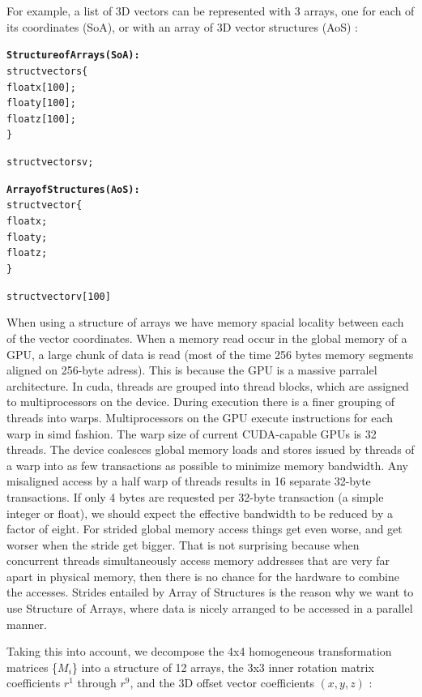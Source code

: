 \documentclass[12pt,journal,compsoc]{IEEEtran}
\begin{document}
For example, a list of 3D vectors can be represented with 3 arrays, one for each of its coordinates (SoA), or with an array of 3D vector structures (AoS) :

\begin{samepage}
\begin{alltt}
\textbf{Structure of Arrays (SoA):}
struct vectors \{
    float x[100];
    float y[100];
    float z[100];
\}

struct vectors v;

\textbf{Array of Structures (AoS):}
struct vector \{
    float x;
    float y;
    float z;
\}

struct vector v[100]
\end{alltt}
\end{samepage}

When using a structure of arrays we have memory spacial locality between each of the vector coordinates. When a memory read occur in the global memory of a GPU, a large chunk of data is read (most of the time 256 bytes memory segments aligned on 256-byte adress). This is because the GPU is a massive parralel architecture.
In \ac{cuda}, threads are grouped into thread blocks, which are assigned to multiprocessors on the device. During execution there is a finer grouping of threads into warps. Multiprocessors on the GPU execute instructions for each warp in \acl{simd} fashion. The warp size of current CUDA-capable GPUs is 32 threads. 
The device coalesces global memory loads and stores issued by threads of a warp into as few transactions as possible to minimize memory bandwidth.
Any misaligned access by a half warp of threads results in 16 separate 32-byte transactions. If only 4 bytes are requested per 32-byte transaction (a simple integer or float), we should expect the effective bandwidth to be reduced by a factor of eight.
For strided global memory access things get even worse, and get worser when the stride get bigger.
That is not surprising because when concurrent threads simultaneously access memory addresses that are very far apart in physical memory, then there is no chance for the hardware to combine the accesses.
Strides entailed by Array of Structures is the reason why we want to use Structure of Arrays, where data is nicely arranged to be accessed in a parallel manner.

Taking this into account, we decompose the 4x4 homogeneous transformation matrices \{$M_i$\} into a structure of 12 arrays, the 3x3 inner rotation matrix coefficients $r^1$ through $r^9$, and the 3D offset vector coefficients $(x,y,z)$ :
\end{document}
